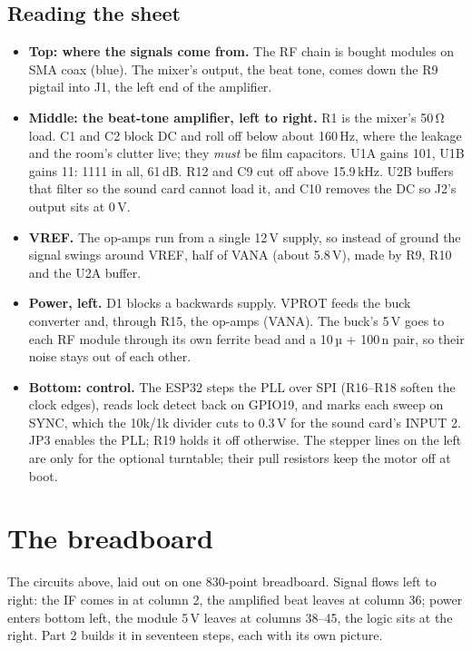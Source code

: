 \documentclass[10pt]{article}
\begin{document}
\subsection*{Reading the sheet}
\begin{itemize}
  \item \textbf{Top: where the signals come from.} The RF chain is bought modules on SMA coax (blue). The mixer's output, the beat tone, comes down the R9 pigtail into J1, the left end of the amplifier.
  \item \textbf{Middle: the beat-tone amplifier, left to right.} R1 is the mixer's 50\,Ω load. C1 and C2 block DC and roll off below about 160\,Hz, where the leakage and the room's clutter live; they \emph{must} be film capacitors. U1A gains 101, U1B gains 11: 1111 in all, 61\,dB. R12 and C9 cut off above 15.9\,kHz. U2B buffers that filter so the sound card cannot load it, and C10 removes the DC so J2's output sits at 0\,V.
  \item \textbf{VREF.} The op-amps run from a single 12\,V supply, so instead of ground the signal swings around VREF, half of VANA (about 5.8\,V), made by R9, R10 and the U2A buffer.
  \item \textbf{Power, left.} D1 blocks a backwards supply. VPROT feeds the buck converter and, through R15, the op-amps (VANA). The buck's 5\,V goes to each RF module through its own ferrite bead and a 10\,µ + 100\,n pair, so their noise stays out of each other.
  \item \textbf{Bottom: control.} The ESP32 steps the PLL over SPI (R16–R18 soften the clock edges), reads lock detect back on GPIO19, and marks each sweep on SYNC, which the 10k/1k divider cuts to 0.3\,V for the sound card's INPUT 2. JP3 enables the PLL; R19 holds it off otherwise. The stepper lines on the left are only for the optional turntable; their pull resistors keep the motor off at boot.
\end{itemize}

\newpage
\section{The breadboard}\label{sec:bb}

The circuits above, laid out on one 830-point breadboard. Signal flows left to right: the IF comes in at column 2, the amplified beat leaves at column 36; power enters bottom left, the module 5\,V leaves at columns 38–45, the logic sits at the right. Part 2 builds it in seventeen steps, each with its own picture.
\end{document}
